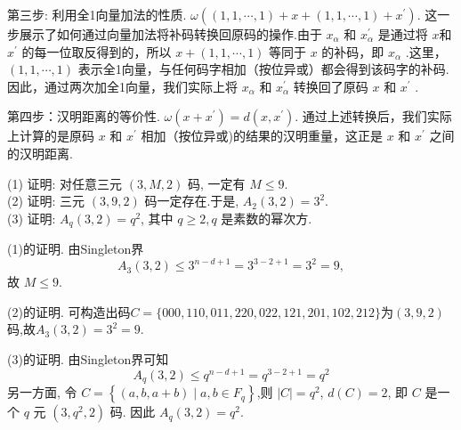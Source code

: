 \begin{solution}
第三步: 利用全1向量加法的性质. $ \omega\left((1,1, \cdots, 1)+x+(1,1, \cdots, 1)+x^{\prime}\right) $. 这一步展示了如何通过向量加法将补码转换回原码的操作.由于 $ x_{\alpha} $ 和 $ x_{\alpha}^{\prime} $ 是通过将 $ x $和 $ x^{\prime} $ 的每一位取反得到的，所以 $ x+(1,1, \cdots, 1) $ 等同于 $ x $ 的补码，即 $ x_{\alpha} $ .这里， $ (1,1, \cdots, 1) $ 表示全1向量，与任何码字相加（按位异或）都会得到该码字的补码.因此，通过两次加全1向量，我们实际上将 $ x_{\alpha} $ 和 $ x_{\alpha}^{\prime} $ 转换回了原码 $ x $ 和 $ x^{\prime} $ .

第四步：汉明距离的等价性. $ \omega\left(x+x^{\prime}\right)=d\left(x, x^{\prime}\right) $. 通过上述转换后，我们实际上计算的是原码 $ x $ 和 $ x^{\prime} $ 相加（按位异或)的结果的汉明重量，这正是 $ x $ 和 $ x^{\prime} $ 之间的汉明距离.

\end{solution}

\begin{exercise}
(1) 证明: 对任意三元 $ (3, M, 2) $ 码, 一定有 $ M \leq 9 $.\\
(2) 证明: 三元 $ (3,9,2) $ 码一定存在.于是, $ A_{2}(3,2)=3^{2} $.\\
(3) 证明: $ A_{q}(3,2)=q^{2} $, 其中 $ q \geq 2, q $ 是素数的幂次方.
\end{exercise}
\begin{solution}
    (1)的证明. 由Singleton界
$$
A_{3}(3,2) \leq 3^{n-d+1}=3^{3-2+1}=3^{2}=9,
$$
 故  $M \leq 9$.

 (2)的证明. 可构造出码$C=\{000,110,011,220,022,121,201,102,212\}$为$(3,9,2)$ 码,故$ A_{3}(3,2)=3^{2}=9 .$

(3)的证明. 由Singleton界可知
$$
A_{q}(3,2) \leq q^{n-d+1}=q^{3-2+1}=q^{2}
$$
另一方面, 令 $ C=\left\{(a, b, a+b) \mid a, b \in F_{q}\right\} $,则 $ |C|=q^{2} $, $ d(C)=2 $, 即 $ C $ 是一个 $ q $ 元 $ \left(3, q^{2}, 2\right) $ 码. 因此 $ A_{q}(3,2)=q^{2} $.
\end{solution}

